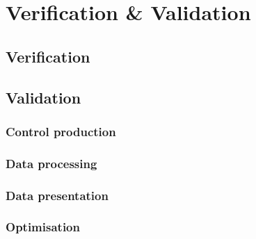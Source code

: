 \section{Verification \& Validation}
\subsection{Verification}
\subsection{Validation}
\subsubsection{Control production} 
\subsubsection{Data processing}
\subsubsection{Data presentation}
\subsubsection{Optimisation}
